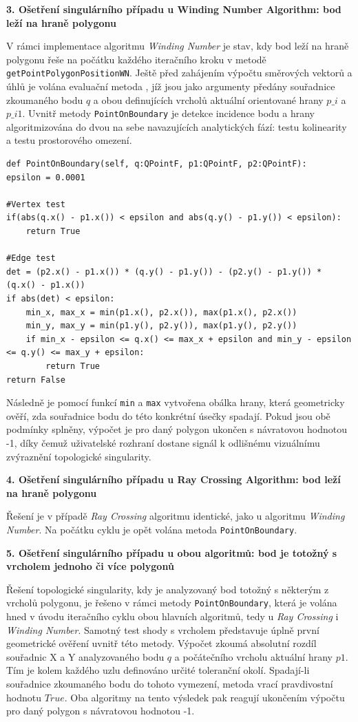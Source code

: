 \documentclass[12pt]{article}
\begin{document}
\textbf{3. Ošetření singulárního případu u Winding Number Algorithm: bod leží na hraně polygonu}

V rámci implementace algoritmu \emph{Winding Number} je stav, kdy bod leží na hraně polygonu řeše na počátku každého iteračního kroku v metodě \texttt{getPointPolygonPositionWN}. Ještě před zahájením výpočtu směrových vektorů a úhlů je volána evaluační metoda , jíž jsou jako argumenty předány souřadnice zkoumaného bodu $q$ a obou definujících vrcholů aktuální orientované hrany $p\_i$ a $p\_i1$. Uvnitř metody \texttt{PointOnBoundary} je detekce incidence bodu a hrany algoritmizována do dvou na sebe navazujících analytických fází: testu kolinearity a testu prostorového omezení.

\begin{lstlisting}[caption={Řešení singulárního případu: bod na hraně polygonu}]
def PointOnBoundary(self, q:QPointF, p1:QPointF, p2:QPointF):
epsilon = 0.0001

#Vertex test
if(abs(q.x() - p1.x()) < epsilon and abs(q.y() - p1.y()) < epsilon):
    return True

#Edge test
det = (p2.x() - p1.x()) * (q.y() - p1.y()) - (p2.y() - p1.y()) * (q.x() - p1.x())
if abs(det) < epsilon:
    min_x, max_x = min(p1.x(), p2.x()), max(p1.x(), p2.x())
    min_y, max_y = min(p1.y(), p2.y()), max(p1.y(), p2.y())
    if min_x - epsilon <= q.x() <= max_x + epsilon and min_y - epsilon <= q.y() <= max_y + epsilon:
        return True
return False
\end{lstlisting}

Následně je pomocí funkcí \texttt{min} a \texttt{max} vytvořena obálka hrany, která geometricky ověří, zda souřadnice bodu do této konkrétní úsečky spadají. Pokud jsou obě podmínky splněny, výpočet je pro daný polygon ukončen s návratovou hodnotou -1, díky čemuž uživatelské rozhraní dostane signál k odlišnému vizuálnímu zvýraznění topologické singularity.

\newpage
\textbf{4. Ošetření singulárního případu u Ray Crossing Algorithm: bod leží na hraně polygonu}

Řešení je v případě \emph{Ray Crossing} algoritmu identické, jako u algoritmu \emph{Winding Number}. Na počátku cyklu je opět volána metoda \texttt{PointOnBoundary}.

\textbf{5. Ošetření singulárního případu u obou algoritmů: bod je totožný s vrcholem jednoho či více polygonů}

Řešení topologické singularity, kdy je analyzovaný bod totožný s některým z vrcholů polygonu, je řešeno v rámci metody \texttt{PointOnBoundary}, která je volána hned v úvodu iteračního cyklu obou hlavních algoritmů, tedy u \emph{Ray Crossing} i \emph{Winding Number}. Samotný test shody s vrcholem představuje úplně první geometrické ověření uvnitř této metody. Výpočet zkoumá absolutní rozdíl souřadnic X a Y analyzovaného bodu $q$ a počátečního vrcholu aktuální hrany $p1$. Tím je kolem každého uzlu definováno určité toleranční okolí. Spadají-li souřadnice zkoumaného bodu do tohoto vymezení, metoda vrací pravdivostní hodnotu $True$. Oba algoritmy na tento výsledek pak reagují ukončením výpočtu pro daný polygon s návratovou hodnotou -1. 
\end{document}
